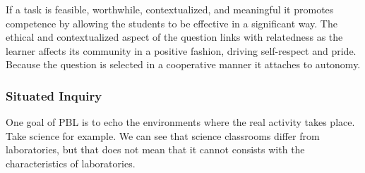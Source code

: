 If a task is feasible, worthwhile, contextualized, and meaningful it promotes
competence by allowing the students to be effective in a significant way. The
ethical and contextualized aspect of the question links with relatedness as the
learner affects its community in a positive fashion, driving self-respect and
pride.  Because the question is selected in a cooperative manner
\cite{education:joseph_phyllis__pbl} it attaches to autonomy.

\subsubsection{Situated Inquiry}

One goal of PBL is to echo the environments where the real activity takes place.
Take science for example. We can see that science classrooms differ from
laboratories, but that does not mean that it cannot consists with the
characteristics of laboratories. 

